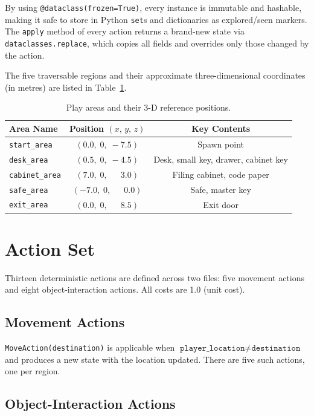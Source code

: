 \documentclass[12pt, a4paper]{report}
\begin{document}
By using \texttt{@dataclass(frozen=True)}, every instance is immutable and
hashable, making it safe to store in Python \texttt{set}s and dictionaries as
explored/seen markers.  The \texttt{apply} method of every action returns a
brand-new state via \texttt{dataclasses.replace}, which copies all fields and
overrides only those changed by the action.

The five traversable regions and their approximate three-dimensional coordinates
(in metres) are listed in Table~\ref{tab:areas}.

\begin{table}[H]
\centering
\caption{Play areas and their 3-D reference positions.}
\label{tab:areas}
\begin{tabular}{lcc}
\toprule
\textbf{Area Name} & \textbf{Position $(x,\,y,\,z)$} & \textbf{Key Contents} \\
\midrule
\texttt{start\_area}   & $(0.0,\;0,\;-7.5)$             & Spawn point \\
\texttt{desk\_area}    & $(0.5,\;0,\;-4.5)$             & Desk, small key, drawer, cabinet key \\
\texttt{cabinet\_area} & $(7.0,\;0,\;\phantom{-}3.0)$   & Filing cabinet, code paper \\
\texttt{safe\_area}    & $(-7.0,\;0,\;\phantom{-}0.0)$  & Safe, master key \\
\texttt{exit\_area}    & $(0.0,\;0,\;\phantom{-}8.5)$   & Exit door \\
\bottomrule
\end{tabular}
\end{table}

\section{Action Set}
\label{sec:actions}

Thirteen deterministic actions are defined across two files: five movement
actions and eight object-interaction actions.  All costs are 1.0 (unit cost).

\subsection{Movement Actions}

\texttt{MoveAction(destination)} is applicable when
$\texttt{player\_location} \neq \texttt{destination}$ and produces a new state
with the location updated.  There are five such actions, one per region.

\subsection{Object-Interaction Actions}
\end{document}
